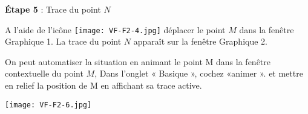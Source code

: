 \textbf{Étape 5 }: Trace du point $N$

\vspace{0.2cm}

A l'aide de l’icône  \texttt{[image: VF-F2-4.jpg]}         déplacer le point $M$ dans la fenêtre Graphique 1. La trace du point $N$ apparaît sur la fenêtre Graphique 2.

On peut automatiser la situation en animant le point M dans la fenêtre contextuelle du point $M$, Dans l'onglet « Basique », cochez «animer ». et mettre en relief la position de M en affichant sa trace active.

\texttt{[image: VF-F2-6.jpg]} 